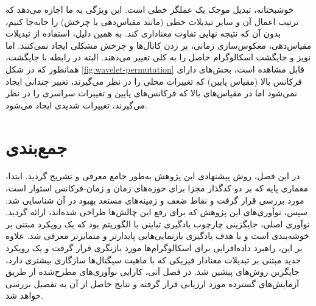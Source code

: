 خوشبختانه، تبدیل موجک یک عملگر خطی است. این ویژگی به ما اجازه می‌دهد که ترتیب اعمال آن و سایر تبدیلات خطی (مانند مقیاس‌دهی یا چرخش) را جابه‌جا کنیم، بدون آن که نتیجه نهایی تفاوت معناداری کند. به همین دلیل، استفاده از تبدیلات مقیاس‌دهی، معکوس‌سازی زمانی، بر زدن کانال‌ها و چرخش مشکلی ایجاد نمی‌کنند. اما نویز و جایگشت اسکالوگرام حاصل را به کلی تغییر می‌دهند. البته در رابطه با جایگشت، همانطور که در شکل \ref{fig:wavelet-permutation} قابل مشاهده است،
بخش‌های دارای فرکانس بالا (مقیاس پایین) که تغییرات محلی را در نظر می‌گیرند، تغییر چندانی ایجاد نمی‌شود اما در مقیاس‌های بالا که فرکانس‌های پایین و تغییرات سراسری را در نظر می‌گیرند، تغییرات شدیدی ایجاد می‌شود.

\section{جمع‌بندی}

در این فصل، روش پیشنهادی این پژوهش به‌طور جامع معرفی و تشریح گردید. ابتدا، معماری پایه که بر دو کدگذار مجزا برای حوزه‌های زمان و زمان-فرکانس استوار است، مورد بررسی قرار گرفت و نقاط ضعف و زمینه‌های مستعد بهبود در آن شناسایی شد. سپس، نوآوری‌های این پژوهش که برای رفع این چالش‌ها طراحی شده‌اند، ارائه گردید. نوآوری اصلی، جایگزینی چارچوب یادگیری تباینی  با الگوریتم  بود که یک رویکرد مبتنی بر خوشه‌بندی است و با هدف یادگیری بازنمایی‌هایی پایدارتر و متمایزتر معرفی شد. علاوه بر این، راهبرد داده‌افزایی برای اسکالوگرام‌ها مورد بازنگری قرار گرفت و یک رویکرد جدید مبتنی بر تبدیلات معنادار فیزیکی که با ماهیت سیگنال‌ها سازگاری بیشتری دارد، جایگزین روش‌های پیشین شد. در فصل آتی، کارایی نوآوری‌های مطرح‌شده از طریق آزمایش‌های گسترده مورد ارزیابی قرار گرفته و نتایج حاصل از آن به تفصیل بررسی خواهد شد.
